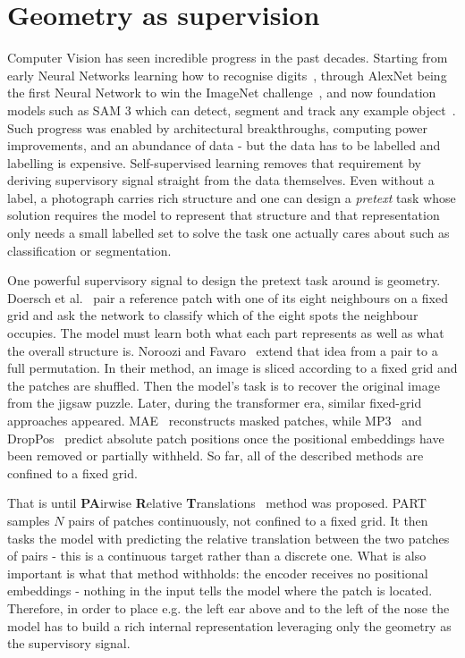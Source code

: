 \documentclass[final_report.tex]{subfiles}
\begin{document}
\label{ch:introduction}

\section{Geometry as supervision}\label{sec:geometry-as-supervision}
Computer Vision has seen incredible progress in the past decades. Starting from early Neural Networks learning how to recognise digits~\cite{mnist}, through AlexNet being the first Neural Network to win the ImageNet challenge~\cite{alexnet}, and now foundation models such as SAM 3 which can detect, segment and track any example object~\cite{sam3}. Such progress was enabled by architectural breakthroughs, computing power improvements, and an abundance of data - but the data has to be labelled and labelling is expensive. Self-supervised learning removes that requirement by deriving supervisory signal straight from the data themselves. Even without a label, a photograph carries rich structure and one can design a \emph{pretext} task whose solution requires the model to represent that structure and that representation only needs a small labelled set to solve the task one actually cares about such as classification or segmentation.

One powerful supervisory signal to design the pretext task around is geometry. Doersch et al.~\cite{context2015} pair a reference patch with one of its eight neighbours on a fixed grid and ask the network to classify which of the eight spots the neighbour occupies. The model must learn both what each part represents as well as what the overall structure is. Noroozi and Favaro~\cite{jigsaw} extend that idea from a pair to a full permutation. In their method, an image is sliced according to a fixed grid and the patches are shuffled. Then the model's task is to recover the original image from the jigsaw puzzle. Later, during the transformer era, similar fixed-grid approaches appeared. MAE~\cite{mae}  reconstructs masked patches, while MP3~\cite{mp3} and DropPos~\cite{droppos} predict absolute patch positions once the positional embeddings have been removed or partially withheld. So far, all of the described methods are confined to a fixed grid.

That is until \textbf{PA}irwise \textbf{R}elative \textbf{T}ranslations~\cite{part} method was proposed. PART samples $N$ pairs of patches continuously, not confined to a fixed grid. It then tasks the model with predicting the relative translation \dxy{} between the two patches of pairs - this is a continuous target rather than a discrete one. What is also important is what that method withholds: the encoder receives no positional embeddings - nothing in the input tells the model where the patch is located. Therefore, in order to place e.g. the left ear above and to the left of the nose the model has to build a rich internal representation leveraging only the geometry as the supervisory signal.
\end{document}
